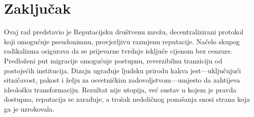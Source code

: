 \documentclass[11pt,a4paper,twocolumn]{article}
\begin{document}
\section{Zaključak}

Ovaj rad predstavio je Reputacijsku društvenu mrežu, decentralizirani protokol koji omogućuje pseudonimnu, provjerljivu razmjenu reputacije. Načelo skupog radikalizma osigurava da se prijevarne tvrdnje isključe cijenom bez cenzure. Predloženi put migracije omogućuje postupnu, reverzibilnu tranziciju od postojećih institucija. Dizajn ugrađuje ljudsku prirodu kakva jest---uključujući sitničavost, pakost i želju za osvetničkim zadovoljstvom---umjesto da zahtijeva ideološku transformaciju. Rezultat nije utopija, već sustav u kojem je pravda dostupna, reputacija se zarađuje, a trošak nedoličnog ponašanja snosi strana koja ga je uzrokovala.


\end{document}
